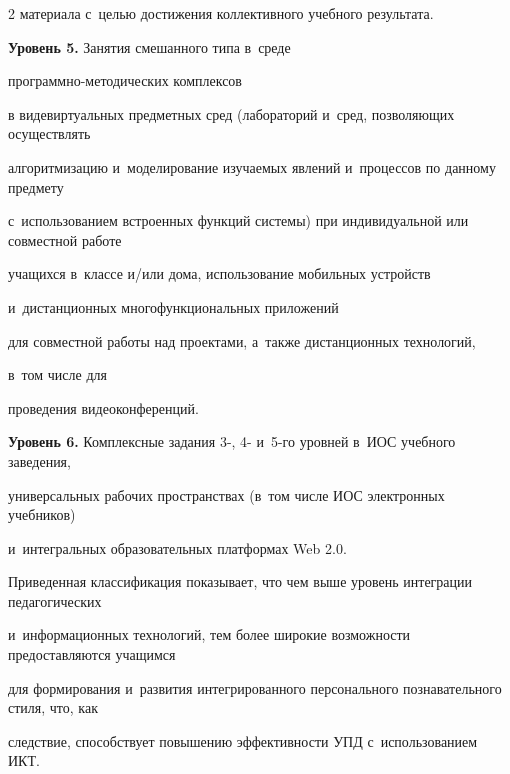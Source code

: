 \begin{multicols}{2}
материала с~целью достижения коллективного учебного результата.





\smallskip





  \textbf{Уровень 5.} Занятия смешанного типа в~среде


  про\-грам\-мно-методических комплексов


в виде\linebreak  виртуальных предметных сред (лабораторий и~сред, позволяющих осуществлять


алгоритмизацию и~моделирование изучаемых явлений и~процессов по данному предмету


с~использованием встроенных функций системы) при индивидуальной или совместной работе


учащихся в~классе и/или дома, использование мобильных устройств


и~дистанционных многофункциональных приложений 


для совместной работы над проектами, а~также дистанционных технологий, 


в~том числе для


проведения видеоконференций.





\smallskip





  \textbf{Уровень 6.} Комплексные задания 3-, 4- и~5-го уровней в~ИОС учебного заведения,


универсальных рабочих пространствах (в~том числе ИОС электронных учебников)


и~интегральных образовательных платформах Web 2.0.





  \medskip





   Приведенная классификация показывает, что чем выше уровень интеграции педагогических


и~информационных технологий, тем более широкие возможности предоставляются учащимся


для формирования и~развития интегрированного персонального познавательного стиля, что, как


следствие, способствует повышению эффективности УПД с~использованием ИКТ.






\end{multicols}
